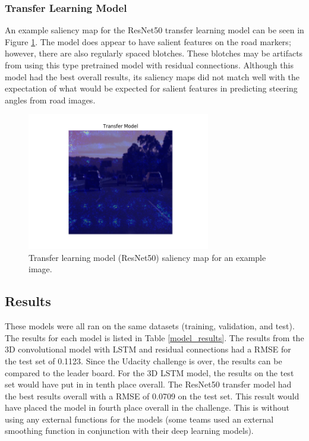 \documentclass[10pt,twocolumn,letterpaper]{article}
\begin{document}
\subsubsection{Transfer Learning Model}

An example saliency map for the ResNet50 transfer learning model can be seen in Figure \ref{resnet50_saliency}. The model does appear to have salient features on the road markers; however, there are also regularly spaced blotches. These blotches may be artifacts from using this type pretrained model with residual connections. Although this model had the best overall results, its saliency maps did not match well with the expectation of what would be expected for salient features in predicting steering angles from road images. 

\begin{figure}[!htb]
	\includegraphics[width=8cm]{resnet50trans_saliency.png}
	\centering
	\caption{Transfer learning model (ResNet50) saliency map for an example image.}
	\label{resnet50_saliency}
\end{figure}


\subsection{Results}
These models were all ran on the same datasets (training, validation, and test). The results for each model is listed in Table \ref{model_results}. The results from the 3D convolutional model with LSTM and residual connections had a RMSE for the test set of 0.1123. Since the Udacity challenge is over, the results can be compared to the leader board. For the 3D LSTM model, the results on the test set would have put in in tenth place overall. The ResNet50 transfer model had the best results overall with a RMSE of 0.0709 on the test set. This result would have placed the model in fourth place overall in the challenge. This is without using any external functions for the models (some teams used an external smoothing function in conjunction with their deep learning models).
\end{document}
